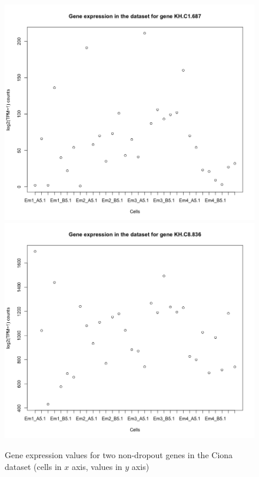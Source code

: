 \documentclass{report}
\begin{document}
{\begin{figure}[H]
\centering
\subfigure\includegraphics[scale=0.35]{plotsCopula/ciona/depCellGene_nodropout_ciona.png}
\subfigure\includegraphics[scale=0.35]{plotsCopula/ciona/depCellGene2_nodropout_ciona.png}
\caption{Gene expression values for two non-dropout genes in the Ciona dataset (cells in $x$ axis, values in $y$ axis)}
\label{geneexpression2}
\end{figure}

}
\end{document}
